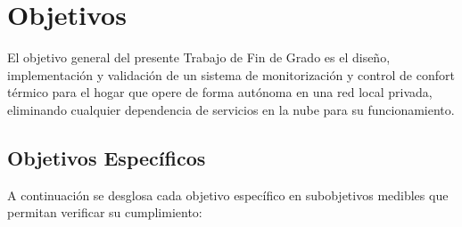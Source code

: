 \chapter{Objetivos}
\label{cap:objetivos}

El objetivo general del presente Trabajo de Fin de Grado es el diseño, implementación y validación de un sistema de monitorización y control de confort térmico para el hogar que opere de forma autónoma en una red local privada, eliminando cualquier dependencia de servicios en la nube para su funcionamiento.

\section{Objetivos Específicos}

A continuación se desglosa cada objetivo específico en subobjetivos medibles que permitan verificar su cumplimiento:

